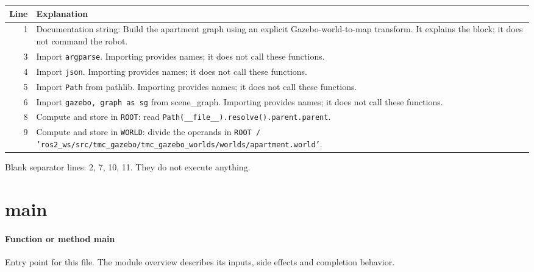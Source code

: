 \documentclass[11pt,a4paper]{book}
\begin{document}
\begin{longtable}{r p{}}

\textbf{Line} & \textbf{Explanation} \\ \hline \endhead

1 & Documentation string: Build the apartment graph using an explicit Gazebo-world-to-map transform. It explains the block; it does not command the robot. \\

3 & Import \texttt{argparse}. Importing provides names; it does not call these functions. \\

4 & Import \texttt{json}. Importing provides names; it does not call these functions. \\

5 & Import \texttt{Path} from pathlib. Importing provides names; it does not call these functions. \\

6 & Import \texttt{gazebo, graph as sg} from scene\_graph. Importing provides names; it does not call these functions. \\

8 & Compute and store in \texttt{ROOT}: read \texttt{Path(\_\_file\_\_).resolve().parent.parent}.  \\

9 & Compute and store in \texttt{WORLD}: divide the operands in \texttt{ROOT / 'ros2\_ws/src/tmc\_gazebo/tmc\_gazebo\_worlds/worlds/apartment.world'}.  \\

\end{longtable}

Blank separator lines: 2, 7, 10, 11. They do not execute anything.

\section{main}

\paragraph{Function or method main}
Entry point for this file. The module overview describes its inputs, side effects and completion behavior.
\end{document}
